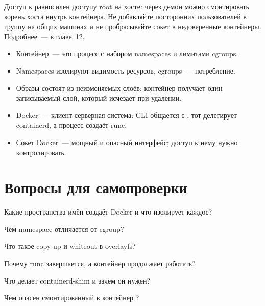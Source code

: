 \begin{warnbox}
Доступ к  равносилен доступу root на хосте:
через демон можно смонтировать корень хоста внутрь контейнера.
Не добавляйте посторонних пользователей в группу 
на общих машинах и не пробрасывайте сокет в недоверенные контейнеры.
Подробнее~--- в главе~12.
\end{warnbox}

\begin{summarybox}
\begin{itemize}
  \item Контейнер~--- это процесс с набором namespaces и лимитами cgroups.
  \item Namespaces изолируют видимость ресурсов, cgroups~--- потребление.
  \item Образы состоят из неизменяемых слоёв; контейнер получает
        один записываемый слой, который исчезает при удалении.
  \item Docker~--- клиент-серверная система: CLI общается с ,
        тот делегирует containerd, а процесс создаёт runc.
  \item Сокет Docker~--- мощный и опасный интерфейс; доступ к нему нужно
        контролировать.
\end{itemize}
\end{summarybox}

\section*{Вопросы для самопроверки}
\begin{selfcheck}
  \item Какие пространства имён создаёт Docker и что изолирует каждое?
  \item Чем namespace отличается от cgroup?
  \item Что такое copy-up и whiteout в overlayfs?
  \item Почему runc завершается, а контейнер продолжает работать?
  \item Что делает containerd-shim и зачем он нужен?
  \item Чем опасен смонтированный в контейнер ?
\end{selfcheck}

